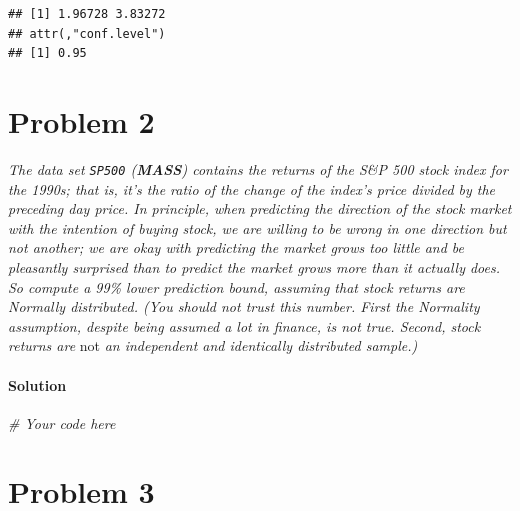 \documentclass[
]{article}
\newenvironment{Shaded}{\begin{snugshade}}{\end{snugshade}}
\newcommand{\AttributeTok}[1]{\textcolor[rgb]{0.77,0.63,0.00}{#1}}
\newcommand{\CommentTok}[1]{\textcolor[rgb]{0.56,0.35,0.01}{\textit{#1}}}
\newcommand{\FunctionTok}[1]{\textcolor[rgb]{0.00,0.00,0.00}{#1}}
\newcommand{\NormalTok}[1]{#1}
\newcommand{\OtherTok}[1]{\textcolor[rgb]{0.56,0.35,0.01}{#1}}
\newcommand{\SpecialCharTok}[1]{\textcolor[rgb]{0.00,0.00,0.00}{#1}}
\newcommand{\StringTok}[1]{\textcolor[rgb]{0.31,0.60,0.02}{#1}}
\begin{document}
\begin{Shaded}
\end{Shaded}

\begin{verbatim}
## [1] 1.96728 3.83272
## attr(,"conf.level")
## [1] 0.95
\end{verbatim}

\hypertarget{problem-2}{%
\section{Problem 2}\label{problem-2}}

\emph{The data set \texttt{SP500} (\textbf{MASS}) contains the returns
of the S\&P 500 stock index for the 1990s; that is, it's the ratio of
the change of the index's price divided by the preceding day price. In
principle, when predicting the direction of the stock market with the
intention of buying stock, we are willing to be wrong in one direction
but not another; we are okay with predicting the market grows too little
and be pleasantly surprised than to predict the market grows more than
it actually does. So compute a 99\% lower prediction bound, assuming
that stock returns are Normally distributed. (You should not trust this
number. First the Normality assumption, despite being assumed a lot in
finance, is not true. Second, stock returns are} not \emph{an
independent and identically distributed sample.)}

\hypertarget{solution-1}{%
\paragraph{Solution}\label{solution-1}}

\begin{Shaded}
\begin{Highlighting}[]
\CommentTok{\# Your code here}
\end{Highlighting}
\end{Shaded}

\hypertarget{problem-3}{%
\section{Problem 3}\label{problem-3}}
\end{document}
